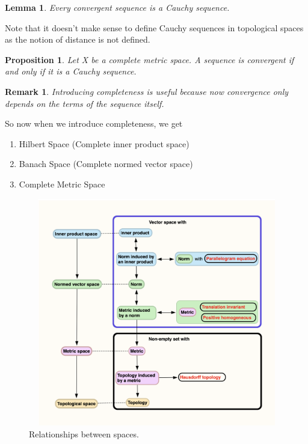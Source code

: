 \documentclass[twoside]{article}
\newtheorem{lemma}[theorem]{Lemma}
\newtheorem{proposition}[theorem]{Proposition}
\newtheorem{remark}[theorem]{Remark}
\begin{document}
\begin{lemma}Every convergent sequence is a Cauchy sequence.
\end{lemma}

Note that it doesn't make sense to define Cauchy sequences in topological spaces as the notion of distance is not defined.

\begin{proposition}Let X be a complete metric space. A sequence is convergent if and only if it is a Cauchy sequence.
\end{proposition}

\begin{remark}Introducing completeness is useful because now convergence only depends on the terms of the sequence itself.
\end{remark}

So now when we introduce completeness, we get
\begin{enumerate}
    \item Hilbert Space (Complete inner product space)
    \item Banach Space (Complete normed vector space)
    \item Complete Metric Space
\end{enumerate}


\begin{center}
\begin{figure}
\includegraphics[height=10cm, width=15cm]{Relationship}
\caption{Relationships between spaces.}
\end{figure}
\end{center}
\end{document}
